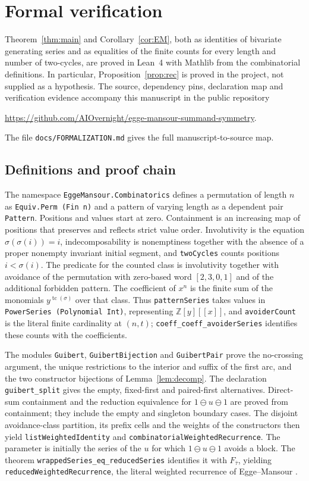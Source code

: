 \documentclass[11pt]{amsart}
\theoremstyle{definition}
\DeclareMathOperator{\tc}{tc}
\newcommand{\Z}{\mathbb{Z}}
\newcommand{\sk}{\ominus}
\newcommand{\red}[1]{\overline{#1}}
\begin{document}
\begingroup
\sloppy
\section{Formal verification}\label{sec:formal}

Theorem~\ref{thm:main} and Corollary~\ref{cor:EM}, both as identities of bivariate generating series and as equalities of the finite counts for every length and number of two-cycles, are proved in Lean~4 with Mathlib from the combinatorial definitions. In particular, Proposition~\ref{prop:rec} is proved in the project, not supplied as a hypothesis. The source, dependency pins, declaration map and verification evidence accompany this manuscript in the public repository
\begin{center}
\url{https://github.com/AIOvernight/egge-mansour-summand-symmetry}.
\end{center}
The file \texttt{docs/FORMALIZATION.md} gives the full manuscript-to-source map.

\subsection{Definitions and proof chain}
The namespace \texttt{EggeMansour.Combinatorics} defines a permutation of length $n$ as \texttt{Equiv.Perm (Fin n)} and a pattern of varying length as a dependent pair \texttt{Pattern}. Positions and values start at zero. Containment is an increasing map of positions that preserves and reflects strict value order. Involutivity is the equation $\sigma(\sigma(i))=i$, indecomposability is nonemptiness together with the absence of a proper nonempty invariant initial segment, and \texttt{twoCycles} counts positions $i<\sigma(i)$. The predicate for the counted class is involutivity together with avoidance of the permutation with zero-based word $[2,3,0,1]$ and of the additional forbidden pattern. The coefficient of $x^n$ is the finite sum of the monomials $y^{\tc(\sigma)}$ over that class. Thus \texttt{patternSeries} takes values in \texttt{PowerSeries (Polynomial Int)}, representing $\Z[y][[x]]$, and \texttt{avoiderCount} is the literal finite cardinality at $(n,t)$; \texttt{coeff\_coeff\_avoiderSeries} identifies these counts with the coefficients.

The modules \texttt{Guibert}, \texttt{GuibertBijection} and \texttt{GuibertPair} prove the no-crossing argument, the unique restrictions to the interior and suffix of the first arc, and the two constructor bijections of Lemma~\ref{lem:decomp}. The declaration \texttt{guibert\_split} gives the empty, fixed-first and paired-first alternatives. Direct-sum containment and the reduction equivalence for $1\sk u\sk1$ are proved from containment; they include the empty and singleton boundary cases. The disjoint avoidance-class partition, its prefix cells and the weights of the constructors then yield \texttt{listWeightedIdentity} and \texttt{combinatorialWeightedRecurrence}. The parameter is initially the series of the $u$ for which $1\sk u\sk1$ avoids a block. The theorem \texttt{wrappedSeries\_eq\_reducedSeries} identifies it with $F_{\red\tau}$, yielding \texttt{reducedWeightedRecurrence}, the literal weighted recurrence of Egge--Mansour \cite[Theorem 3.3]{EggeMansour2006}.
\end{document}
